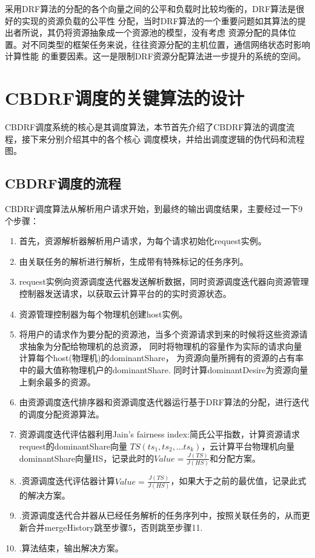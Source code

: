 采用DRF算法的分配的各个向量之间的公平和负载时比较均衡的，DRF算法是很好的实现的资源负载的公平性
分配，当时DRF算法的一个重要问题如其算法的提出者所说，其仍将资源抽象成一个资源池的模型，没有考虑
资源分配的具体位置。对不同类型的框架任务来说，往往资源分配的主机位置，通信网络状态时影响计算性能
的重要因素。这一是限制DRF资源分配算法进一步提升的系统的空间。

\section{CBDRF调度的关键算法的设计}
CBDRF调度系统的核心是其调度算法，本节首先介绍了CBDRF算法的调度流程，接下来分别介绍其中的各个核心
调度模块，并给出调度逻辑的伪代码和流程图。
\subsection{CBDRF调度的流程}
CBDRF调度算法从解析用户请求开始，到最终的输出调度结果，主要经过一下9个步骤：
\begin{enumerate}
\item 首先，资源解析器解析用户请求，为每个请求初始化request实例。
\item 由关联任务的解析进行解析，生成带有特殊标记的任务序列。
\item request实例向资源调度迭代器发送解析数据，同时资源调度迭代器向资源管理控制器发送请求，以获取云计算平台的的实时资源状态。
\item 资源管理控制器为每个物理机创建host实例。
\item 将用户的请求作为要分配的资源池，当多个资源请求到来的时候将这些资源请求抽象为分配给物理机的总资源，
同时将物理机的容量作为实际的请求向量计算每个host(物理机)的dominantShare，
为资源向量所拥有的资源的占有率中的最大值称物理机户的dominantShare.
同时计算dominantDesire为资源向量上剩余最多的资源。
\item 由资源调度迭代排序器和资源调度迭代器运行基于DRF算法的分配，进行迭代的调度分配资源算法。
\item 资源调度迭代评估器利用Jain’s fairness index:简氏公平指数，计算资源请求request的dominantShare向量
$TS\left({ts}_{1},{ts}_{2},…{ts}_{k}\right )$，云计算平台物理机向量dominantShare向量HS，记录此时的$Value = \frac{J(TS)}{J(HS)}$和分配方案。
\item.资源调度迭代评估器计算$Value = \frac{J(TS)}{J(HS)}$，如果大于之前的最优值，记录此式的解决方案。
\item.资源调度迭代合并器从已经任务解析的任务序列中，按照关联任务的，从而更新合并mergeHistory跳至步骤5，否则跳至步骤11.
\item.算法结束，输出解决方案。
\end{enumerate}
